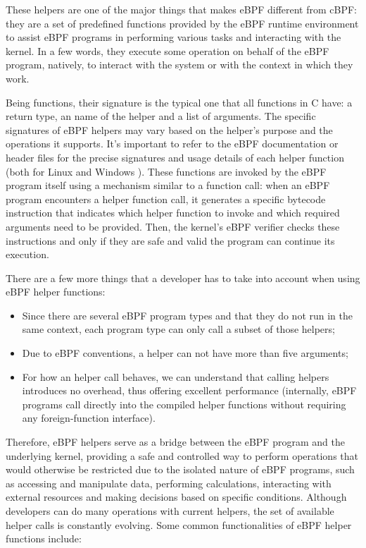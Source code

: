 These helpers are one of the major things that makes eBPF different from cBPF: they are a set of predefined functions provided by the eBPF runtime environment to assist eBPF programs in performing various tasks and interacting with the kernel.
In a few words, they execute some operation on behalf of the eBPF program, natively, to interact with the system or with the context in which they work. 

Being functions, their signature is the typical one that all functions in C have: a return type, an name of the helper and a list of arguments.
The specific signatures of eBPF helpers may vary based on the helper's purpose and the operations it supports. 
It's important to refer to the eBPF documentation or header files for the precise signatures and usage details of each helper function (both for Linux \cite{LinuxHelpers} and Windows \cite{WindowsHelpers}).
These functions are invoked by the eBPF program itself using a mechanism similar to a function call: when an eBPF program encounters a helper function call, it generates a specific bytecode instruction that indicates which helper function to invoke and which required arguments need to be provided.
Then, the kernel's eBPF verifier checks these instructions and only if they are safe and valid the program can continue its execution.

There are a few more things that a developer has to take into account when using eBPF helper functions:

\begin{itemize}
	\item 
		Since there are several eBPF program types and that they do not run in the same context, each program type can only call a subset of those helpers;
	\item 
		Due to eBPF conventions, a helper can not have more than five arguments;
	\item 
		For how an helper call behaves, we can understand that calling helpers introduces no overhead, thus offering excellent performance (internally, eBPF programs call directly into the compiled helper functions without requiring any foreign-function interface).
\end{itemize}

Therefore, eBPF helpers serve as a bridge between the eBPF program and the underlying kernel, providing a safe and controlled way to perform operations that would otherwise be restricted due to the isolated nature of eBPF programs, such as accessing and manipulate data, performing calculations, interacting with external resources and making decisions based on specific conditions.
Although developers can do many operations with current helpers, the set of available helper calls is constantly evolving.
Some common functionalities of eBPF helper functions include:

